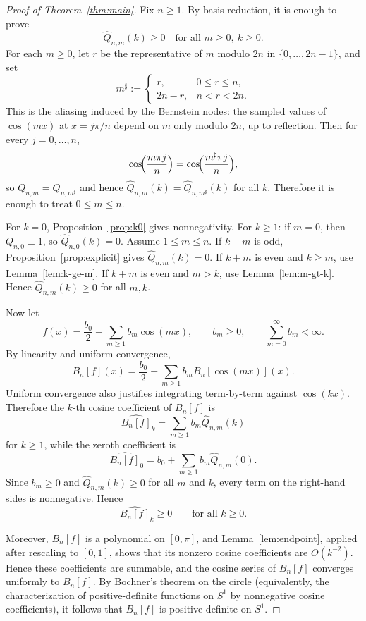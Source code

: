\documentclass[10pt,a4paper]{amsart}
\begin{document}
\begin{proof}[Proof of Theorem~\ref{thm:main}]
Fix $n\ge1$. By basis reduction, it is enough to prove
\[
\widehat Q_{n,m}(k)\ge0
\quad\text{for all }m\ge0,\ k\ge0.
\]
For each $m\ge0$, let $r$ be the representative of $m$ modulo
$2n$ in $\{0,\ldots,2n-1\}$, and set
\[
m^\sharp :=
\begin{cases}
r, & 0\le r\le n,\\
2n-r, & n<r<2n.
\end{cases}
\]
This is the aliasing induced by the Bernstein nodes: the sampled values of $\cos(mx)$ at $x=j\pi/n$ depend on $m$ only modulo $2n$, up to reflection. Then for every $j=0,\dots,n$,
\[
\cos\!\Bigl(\frac{m\pi j}{n}\Bigr)
=\cos\!\Bigl(\frac{m^\sharp\pi j}{n}\Bigr),
\]
so $Q_{n,m}=Q_{n,m^\sharp}$ and hence
$\widehat Q_{n,m}(k)=\widehat Q_{n,m^\sharp}(k)$ for all $k$.
Therefore it is enough to treat $0\le m\le n$.

For $k=0$, Proposition~\ref{prop:k0} gives nonnegativity.
For $k\ge1$:
if $m=0$, then $Q_{n,0}\equiv1$, so $\widehat Q_{n,0}(k)=0$.
Assume $1\le m\le n$.
If $k+m$ is odd, Proposition~\ref{prop:explicit} gives
$\widehat Q_{n,m}(k)=0$.
If $k+m$ is even and $k\ge m$, use Lemma~\ref{lem:k-ge-m}.
If $k+m$ is even and $m>k$, use Lemma~\ref{lem:m-gt-k}.
Hence $\widehat Q_{n,m}(k)\ge0$ for all $m,k$.

Now let
\[
f(x)=\frac{b_0}{2}+\sum_{m\ge1}b_m\cos(mx),\qquad b_m\ge0,\qquad \sum_{m=0}^\infty  b_m<\infty.
\]
By linearity and uniform convergence,
\[
B_n[f](x) = \frac{b_0}{2}+\sum_{m\ge1}b_m  B_n[\cos(mx)](x).
\]
Uniform convergence also justifies integrating term-by-term against $\cos(kx)$. Therefore the $k$-th cosine coefficient of $B_n[f]$ is
\[ 
\widehat{B_n[f]}_k = \sum_{m\ge1} b_m \widehat Q_{n,m}(k) 
\] 
for $k\ge1$, while the zeroth coefficient is 
\[ 
\widehat{B_n[f]}_0 = b_0+\sum_{m\ge1}b_m \widehat Q_{n,m}(0). 
\]
Since $b_m\ge0$ and $\widehat Q_{n,m}(k)\ge0$ for all $m$ and $k$, every term on the right-hand sides is nonnegative. Hence
\[ \widehat{B_n[f]}_k\ge0 \qquad\text{for all }k\ge0. \]

Moreover, $B_n[f]$ is a polynomial on $[0,\pi]$, and Lemma~\ref{lem:endpoint}, applied after rescaling to $[0,1]$, shows that its nonzero cosine coefficients are $O(k^{-2})$. Hence these coefficients are summable, and the cosine series of $B_n[f]$ converges uniformly to $B_n[f]$. By Bochner's theorem on the circle (equivalently, the characterization of positive-definite functions on $S^1$ by nonnegative cosine coefficients), it follows that $B_n[f]$ is positive-definite on $S^1$.
\end{proof}
\end{document}
